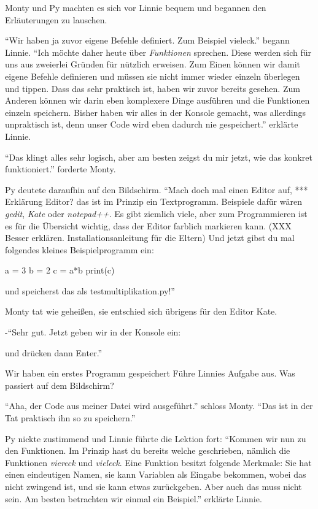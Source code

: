 \documentclass[a5paper,12pt,twoside,openright]{scrbook}
\begin{document}
Monty und Py machten es sich vor Linnie bequem und begannen den Erläuterungen zu lauschen.

``Wir haben ja zuvor eigene Befehle definiert. Zum Beispiel vieleck.''
begann Linnie.
``Ich möchte daher heute über \emph{Funktionen} sprechen. Diese werden sich für uns aus zweierlei Gründen 
für nützlich erweisen.
Zum Einen können wir damit eigene Befehle definieren und müssen sie nicht immer wieder einzeln überlegen und tippen.
Dass das sehr praktisch ist, haben wir zuvor bereits gesehen.
Zum Anderen können wir darin eben komplexere Dinge ausführen und die Funktionen einzeln speichern.
Bisher haben wir alles in der Konsole gemacht, was allerdings unpraktisch ist, denn unser Code 
wird eben dadurch nie gespeichert.'' erklärte Linnie.

``Das klingt alles sehr logisch, aber am besten zeigst du mir jetzt, wie das konkret funktioniert.'' 
forderte Monty.

Py deutete daraufhin auf den Bildschirm.
``Mach doch mal einen Editor auf, *** Erklärung Editor?
 das ist im Prinzip ein Textprogramm.
Beispiele dafür wären \emph{gedit}, \emph{Kate} oder \emph{notepad++}.
Es gibt ziemlich viele, aber zum Programmieren ist es für die Übersicht wichtig, dass der Editor 
farblich markieren kann. (XXX Besser erklären. Installationsanleitung für die Eltern)
Und jetzt gibst du mal folgendes kleines Beispielprogramm ein:
\begin{pythoncode}
 a = 3 
 b = 2
 c = a*b 
 print(c)
\end{pythoncode}
% 
und speicherst das als testmultiplikation.py!''

Monty tat wie gehei{\ss}en, sie entschied sich übrigens für den Editor Kate.

-``Sehr gut. Jetzt geben wir in der Konsole ein: 

und drücken dann Enter.''

\begin{aufgabe}{Wir haben ein erstes Programm gespeichert}
Führe Linnies Aufgabe aus. Was passiert auf dem Bildschirm?
\end{aufgabe}

``Aha, der Code aus meiner Datei wird ausgeführt.'' schloss Monty.
``Das ist in der Tat praktisch ihn so zu speichern.''

Py nickte zustimmend und Linnie führte die Lektion fort:
``Kommen wir nun zu den Funktionen. 
Im Prinzip hast du bereits welche geschrieben, nämlich die Funktionen \emph{viereck} und \emph{vieleck}.
Eine Funktion besitzt folgende Merkmale: Sie hat einen eindeutigen Namen, sie kann Variablen als Eingabe bekommen, 
wobei das nicht zwingend ist, und sie kann etwas zurückgeben. Aber auch das muss nicht sein.
Am besten betrachten wir einmal ein Beispiel.'' erklärte Linnie.
\end{document}
